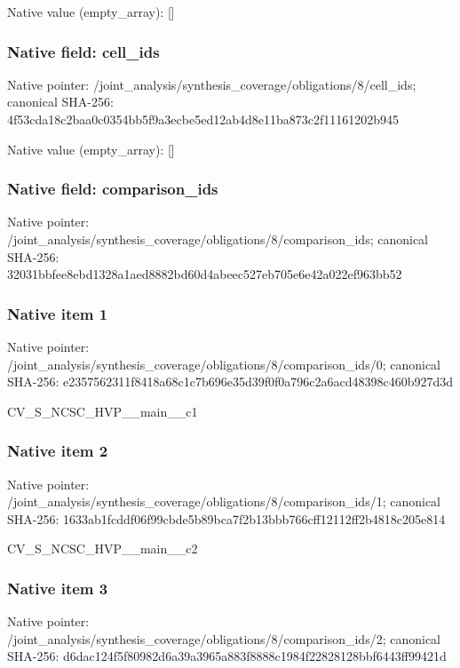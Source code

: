 \documentclass[10pt,a4paper]{article}
\begin{document}
Native value (empty\_\allowbreak{}array): []

\subsubsection{Native field: cell\_\allowbreak{}ids}
Native pointer: /joint\_\allowbreak{}analysis/synthesis\_\allowbreak{}coverage/obligations/8/cell\_\allowbreak{}ids; canonical SHA-256: 4f53cda18c2baa0c0354bb5f9a3ecbe5ed12ab4d8e11ba873c2f11161202b945

Native value (empty\_\allowbreak{}array): []

\subsubsection{Native field: comparison\_\allowbreak{}ids}
Native pointer: /joint\_\allowbreak{}analysis/synthesis\_\allowbreak{}coverage/obligations/8/comparison\_\allowbreak{}ids; canonical SHA-256: 32031bbfee8ebd1328a1aed8882bd60d4abeec527eb705e6e42a022ef963bb52

\subsubsection{Native item 1}
Native pointer: /joint\_\allowbreak{}analysis/synthesis\_\allowbreak{}coverage/obligations/8/comparison\_\allowbreak{}ids/0; canonical SHA-256: e2357562311f8418a68c1c7b696e35d39f0f0a796c2a6acd48398c460b927d3d

\begingroup\raggedright\sloppy CV\_\allowbreak{}S\_\allowbreak{}NCSC\_\allowbreak{}HVP\_\allowbreak{}\_\allowbreak{}main\_\allowbreak{}\_\allowbreak{}c1\par\endgroup

\subsubsection{Native item 2}
Native pointer: /joint\_\allowbreak{}analysis/synthesis\_\allowbreak{}coverage/obligations/8/comparison\_\allowbreak{}ids/1; canonical SHA-256: 1633ab1fcddf06f99cbde5b89bca7f2b13bbb766cff12112ff2b4818c205e814

\begingroup\raggedright\sloppy CV\_\allowbreak{}S\_\allowbreak{}NCSC\_\allowbreak{}HVP\_\allowbreak{}\_\allowbreak{}main\_\allowbreak{}\_\allowbreak{}c2\par\endgroup

\subsubsection{Native item 3}
Native pointer: /joint\_\allowbreak{}analysis/synthesis\_\allowbreak{}coverage/obligations/8/comparison\_\allowbreak{}ids/2; canonical SHA-256: d6dac124f5f80982d6a39a3965a883f8888c1984f22828128bbf6443ff99421d
\end{document}
